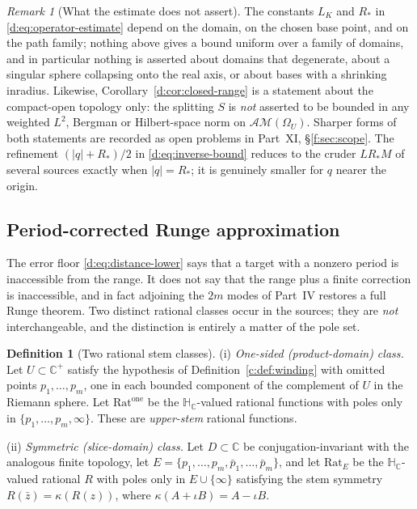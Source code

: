 \documentclass[11pt,a4paper]{article}
\numberwithin{equation}{section}
\theoremstyle{definition}
\newtheorem{definition}[theorem]{Definition}
\theoremstyle{remark}
\newtheorem{remark}[theorem]{Remark}
\theoremstyle{plain}
\newcommand{\HC}{\mathbb H_{\mathbb C}}
\newcommand{\CC}{\mathbb C}
\newcommand{\Cplus}{\CC^{+}}
\newcommand{\AM}{\mathcal{AM}}
\newcommand{\Om}{\Omega}
\newcommand{\abs}[1]{\lvert #1\rvert}
\begin{document}
\begin{remark}[What the estimate does not assert]
\label{d:rem:no-uniform}
The constants $L_K$ and $R_*$ in \eqref{d:eq:operator-estimate} depend on
the domain, on the chosen base point, and on the path family; nothing above
gives a bound uniform over a family of domains, and in particular nothing
is asserted about domains that degenerate, about a singular sphere
collapsing onto the real axis, or about bases with a shrinking
inradius.  Likewise, Corollary~\ref{d:cor:closed-range} is a statement about
the compact-open topology only: the splitting $S$ is \emph{not} asserted to
be bounded in any weighted $L^2$, Bergman or Hilbert-space norm on
$\AM(\Om_U)$.  Sharper forms of both statements are recorded as open
problems in Part~XI, \S\ref{f:sec:scope}.  The refinement $(\abs q+R_*)/2$ in
\eqref{d:eq:inverse-bound} reduces to the cruder $LR_*M$ of several sources
exactly when $\abs q=R_*$; it is genuinely smaller for $q$ nearer the
origin.
\end{remark}

\subsection{Period-corrected Runge approximation}

The error floor \eqref{d:eq:distance-lower} says that a target with a
nonzero period is inaccessible from the range.  It does not say that the
range plus a finite correction is inaccessible, and in fact adjoining the
$2m$ modes of Part~IV restores a full Runge theorem.  Two distinct
rational classes occur in the sources; they are \emph{not} interchangeable,
and the distinction is entirely a matter of the pole set.

\begin{definition}[Two rational stem classes]
\label{d:def:rational}
(i) \emph{One-sided (product-domain) class.}  Let $U\subset\Cplus$ satisfy
the hypothesis of Definition~\ref{c:def:winding} with omitted points
$p_1,\dots,p_m$, one in each bounded component of the complement of $U$ in
the Riemann sphere.  Let $\mathrm{Rat}^{\mathrm{one}}$ be the $\HC$-valued
rational functions with poles only in $\{p_1,\dots,p_m,\infty\}$.  These
are \emph{upper-stem} rational functions.

(ii) \emph{Symmetric (slice-domain) class.}  Let $D\subset\CC$ be
conjugation-invariant with the analogous finite topology, let
$E=\{p_1,\dots,p_m,\bar p_1,\dots,\bar p_m\}$, and let $\mathrm{Rat}_E$ be
the $\HC$-valued rational $R$ with poles only in $E\cup\{\infty\}$
satisfying the stem symmetry $R(\bar z)=\kappa(R(z))$, where
$\kappa(A+\iota B)=A-\iota B$.
\end{definition}
\end{document}
